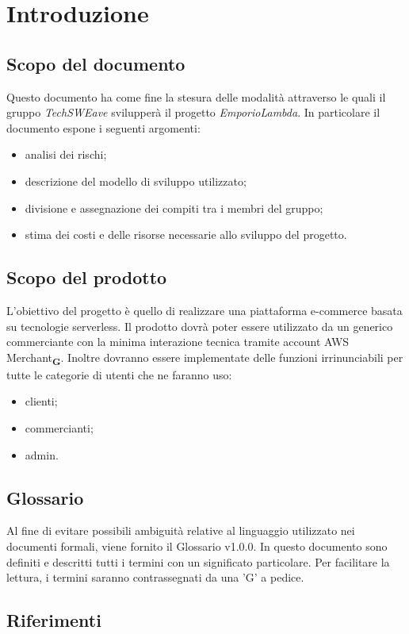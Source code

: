 \section{Introduzione}
    \subsection{Scopo del documento}
    Questo documento ha come fine la stesura delle modalità attraverso le quali il gruppo \emph{TechSWEave} svilupperà il progetto \emph{EmporioLambda}. In particolare il documento espone i seguenti argomenti:
    \begin{itemize}
        \item analisi dei rischi;
        \item descrizione del modello di sviluppo utilizzato;
        \item divisione e assegnazione dei compiti tra i membri del gruppo;
        \item stima dei costi e delle risorse necessarie allo sviluppo del progetto.
    \end{itemize}
    \subsection{Scopo del prodotto}
    L'obiettivo del progetto è quello di realizzare una piattaforma e-commerce basata su tecnologie serverless. Il prodotto dovrà poter essere utilizzato da un generico commerciante con la minima interazione tecnica tramite account AWS Merchant\textsubscript{\textbf{G}}. Inoltre dovranno essere implementate delle funzioni irrinunciabili per tutte le categorie di utenti che ne faranno uso:
    \begin{itemize}
        \item clienti;
        \item commercianti;
        \item admin.
    \end{itemize}
    \subsection{Glossario}
    Al fine di evitare possibili ambiguità relative al linguaggio utilizzato nei documenti formali, viene fornito il Glossario v1.0.0. In questo documento sono definiti e descritti tutti i termini con un significato particolare. Per facilitare la lettura, i termini saranno contrassegnati da una ’G’ a pedice.
    \subsection{Riferimenti}
